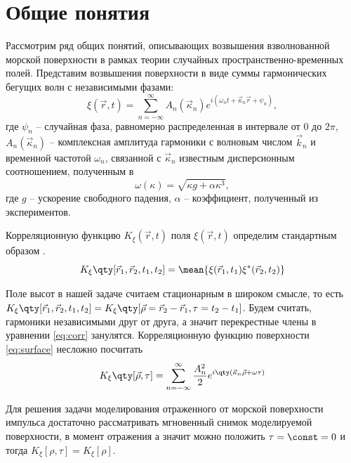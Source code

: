 
\newcommand{\tK}{\widetilde K}
\section{Общие понятия}%
\label{sec:obshchie_poniatiia}
Рассмотрим ряд общих понятий, описывающих возвышения взволнованной морской поверхности в рамках теории случайных пространственно-временных
полей. Представим возвышения поверхности в виде суммы гармонических бегущих волн с независимыми фазами:
\begin{equation}
    \label{eq:surface}
    \xi(\vec r,t) = \sum\limits_{n=-\infty}^{\infty} 
        A_n(\vec \kappa_n) e^{i(\omega_n t + \vec \kappa_n \vec r + \psi_n)},
\end{equation}
где $\psi_n$ -- случайная фаза,
равномерно распределенная в интервале от $0$ до  $2 \pi$, 
$A_n (\vec \kappa_n)$ -- комплексная амплитуда гармоники с волновым числом
$\vec k_n$ и временной частотой  $\omega_n$, связанной с  $\vec \kappa_n$ известным
дисперсионным соотношением, полученным в \cite{cite:4}
\begin{equation}
    \omega(\kappa) = \sqrt{\kappa g + \alpha \kappa^3},
\end{equation}
где $g$ -- ускорение свободного падения,  $\alpha$ -- коэффициент, полученный
из экспериментов.


Корреляционную функцию $K_{\xi}(\vec r,t)$ поля  $\xi(\vec r, t) $ определим
стандартным образом \cite{cite:corr}.
 \begin{equation}
    \label{eq:corr}
    K_{\xi}\qty[\vec r_1, \vec r_2, t_1,t_2] = \mean{\xi(\vec r_1,t_1)\xi^*(\vec r_2,t_2)}
\end{equation}

Поле высот в нашей задаче считаем стационарным в широком смысле, то есть 
$K_{\xi}\qty[\vec r_{1},\vec r_{2},t_{1},t_{2}] = K_{\xi}\qty[\vec \rho = \vec
r_{2} - \vec r_1, \tau=t_{2}-t_{1}]$. Будем считать, гармоники
независимыми друг от друга, а значит перекрестные члены в уравнении
\eqref{eq:corr} занулятся.
Корреляционную функцию поверхности
\eqref{eq:surface} несложно посчитать
\begin{equation}
    \label{eq:surface_corr}
    K_{\xi}\qty[\vec \rho,\tau] = \sum\limits_{n=-\infty}^{\infty} 
    \frac{A_n^2}{2} 
    e^{i \qty(\vec \kappa_n \vec \rho + \omega \tau)}
\end{equation}

Для решения задачи моделирования отраженного от морской поверхности импульса
достаточно рассматривать мгновенный снимок моделируемой поверхности, в момент
отражения
а значит можно положить $\tau = \const = 0$  и  тогда $K_\xi[\rho,\tau] = K_\xi [\rho]$.

